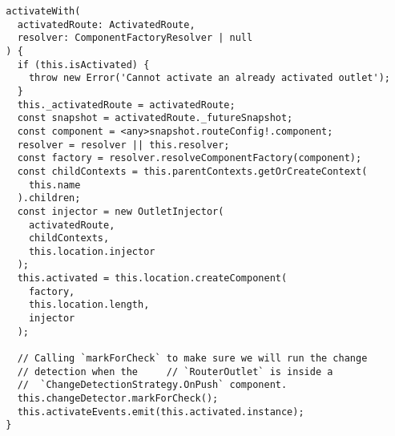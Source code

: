 \begin{verbatim}
  activateWith(
    activatedRoute: ActivatedRoute,
    resolver: ComponentFactoryResolver | null
  ) {
    if (this.isActivated) {
      throw new Error('Cannot activate an already activated outlet');
    }
    this._activatedRoute = activatedRoute;
    const snapshot = activatedRoute._futureSnapshot;
    const component = <any>snapshot.routeConfig!.component;
    resolver = resolver || this.resolver;
    const factory = resolver.resolveComponentFactory(component);
    const childContexts = this.parentContexts.getOrCreateContext(
      this.name
    ).children;
    const injector = new OutletInjector(
      activatedRoute,
      childContexts,
      this.location.injector
    );
    this.activated = this.location.createComponent(
      factory,
      this.location.length,
      injector
    );

    // Calling `markForCheck` to make sure we will run the change
    // detection when the     // `RouterOutlet` is inside a
    //  `ChangeDetectionStrategy.OnPush` component.
    this.changeDetector.markForCheck();
    this.activateEvents.emit(this.activated.instance);
  }
\end{verbatim}
